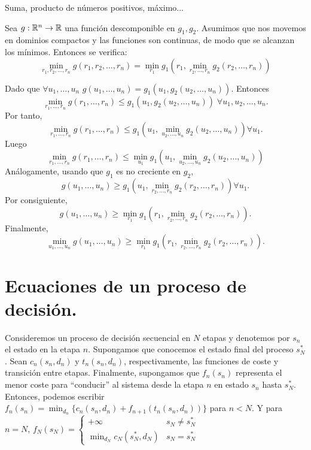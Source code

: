 \documentclass[MIOP.tex]{subfiles}
\begin{document}
\begin{ej}
Suma, producto de números positivos, máximo... 
\end{ej}

\begin{teorema}[Mitten] 
Sea $g:\mathbb{R}^n\to\mathbb{R}$ una función descomponible en $g_1,g_2$. Asumimos que nos movemos en dominios compactos y las funciones son continuas, de modo que se alcanzan los mínimos. Entonces se verifica:
$$\min_{r_1,r_2,\dots,r_n} g(r_1,r_2,\dots,r_n)=\min_{r_1} g_1(r_1,\min_{r_2,\dots,r_n}g_2(r_2,\dots,r_n))$$

\end{teorema}
\begin{dem}
Dado que $\forall u_1,\dots, u_n$ $g(u_1,\dots, u_n)=g_1(u_1,g_2(u_2,\dots, u_n))$. Entonces 
$$\min_{r_1,\dots,r_n}g(r_1,\dots,r_n)\leq g_1(u_1,g_2(u_2,\dots, u_n))\;\forall u_1,u_2,\dots,u_n.
$$ 
Por tanto, 
$$\min_{r_1,\dots,r_n}g(r_1,\dots,r_n)\leq g_1(u_1,\min_{u_2,\dots,u_n}g_2(u_2,\dots, u_n))\forall u_1.$$ 
Luego 
$$\min_{r_1,\dots,r_n}g(r_1,\dots,r_n)\leq \min_{u_1}g_1(u_1,\min_{u_2,\dots,u_n}g_2(u_2,\dots, u_n))$$
Análogamente, usando que $g_1$ es no creciente en $g_2$, $$g(u_1,\dots, u_n)\geq g_1(u_1,\min_{r_2,\dots,r_n}g_2(r_2,\dots,r_n))\forall u_1.$$ Por consiguiente, 
$$g(u_1,\dots, u_n)\geq \min_{r_1}g_1(r_1,\min_{r_2,\dots,r_n}g_2(r_2,\dots,r_n)).$$ Finalmente,
$$\min_{u_1,\dots,u_n}g(u_1,\dots, u_n)\geq \min_{r_1}g_1(r_1,\min_{r_2,\dots,r_n}g_2(r_2,\dots,r_n)).$$\QED
\end{dem}

\section{Ecuaciones de un proceso de decisión.}
Consideremos un proceso de decisión secuencial en $N$ etapas y denotemos por $s_n$ el estado en la etapa $n$. Supongamos que conocemos el estado final del proceso $s_N^*$. Sean $c_n(s_n,d_n)$ y $t_n(s_n,d_n)$, respectivamente, las funciones de coste y transición entre etapas. Finalmente, supongamos que $f_n(s_n)$ representa el menor coste para ``conducir'' al sistema desde la etapa $n$ en estado $s_n$ hasta $s_N^*$. Entonces, podemos escribir $f_n(s_n)=\min_{d_n}\{c_n(s_n,d_n)+f_{n+1}(t_n(s_n,d_n))\}$ para $n<N$. Y para $n=N$, $f_N(s_N)=\begin{cases}
+\infty & s_N\neq s_N^*\\
\min_{d_N}c_N(s_N^*, d_N) & s_N=s_N^*
\end{cases}$
\end{document}
